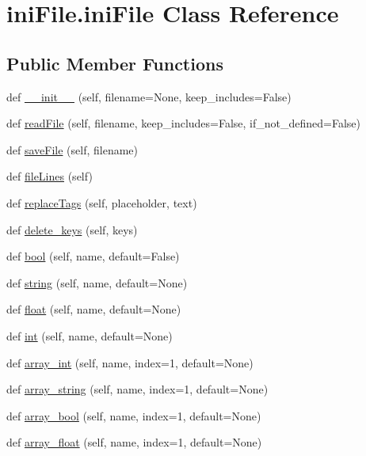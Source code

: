 \hypertarget{classiniFile_1_1iniFile}{}\section{ini\+File.\+ini\+File Class Reference}
\label{classiniFile_1_1iniFile}
\subsection*{Public Member Functions}
\begin{DoxyCompactItemize}
\item 
def \mbox{\hyperlink{classiniFile_1_1iniFile_a3485815795ff0a30308502cfc793d99a}{\+\_\+\+\_\+init\+\_\+\+\_\+}} (self, filename=None, keep\+\_\+includes=False)
\item 
def \mbox{\hyperlink{classiniFile_1_1iniFile_ae8d224f441caa05fe9ecad65bf2ed489}{read\+File}} (self, filename, keep\+\_\+includes=False, if\+\_\+not\+\_\+defined=False)
\item 
def \mbox{\hyperlink{classiniFile_1_1iniFile_aa1ad88973b6e0d72d2eb0bd4ca865206}{save\+File}} (self, filename)
\item 
def \mbox{\hyperlink{classiniFile_1_1iniFile_a61460ca894d71e86784b1a79b244bf11}{file\+Lines}} (self)
\item 
def \mbox{\hyperlink{classiniFile_1_1iniFile_afd14693fddd1954ffe6c7a8157eaf2f5}{replace\+Tags}} (self, placeholder, text)
\item 
def \mbox{\hyperlink{classiniFile_1_1iniFile_a761fc1405e7d865552a70c15bf205201}{delete\+\_\+keys}} (self, keys)
\item 
def \mbox{\hyperlink{classiniFile_1_1iniFile_a9b2217762990e4d84c0d5f4de5fdd276}{bool}} (self, name, default=False)
\item 
def \mbox{\hyperlink{classiniFile_1_1iniFile_a1ecee7d1dc8b4265f09528e0680cffe8}{string}} (self, name, default=None)
\item 
def \mbox{\hyperlink{classiniFile_1_1iniFile_ab471d92ca6e30f4df3b98f982a5656c6}{float}} (self, name, default=None)
\item 
def \mbox{\hyperlink{classiniFile_1_1iniFile_ade7c382459479ea30036a227764b834f}{int}} (self, name, default=None)
\item 
def \mbox{\hyperlink{classiniFile_1_1iniFile_a23da7a086705b52cbf4d55bafbe0f3da}{array\+\_\+int}} (self, name, index=1, default=None)
\item 
def \mbox{\hyperlink{classiniFile_1_1iniFile_a7f2eb7ebbb9192e7fb7ecefe01133444}{array\+\_\+string}} (self, name, index=1, default=None)
\item 
def \mbox{\hyperlink{classiniFile_1_1iniFile_abf1b3994c4b30f12a06b51562e30898f}{array\+\_\+bool}} (self, name, index=1, default=None)
\item 
def \mbox{\hyperlink{classiniFile_1_1iniFile_a6608bf642e15eb6992c3279c2902dc39}{array\+\_\+float}} (self, name, index=1, default=None)
\end{DoxyCompactItemize}
